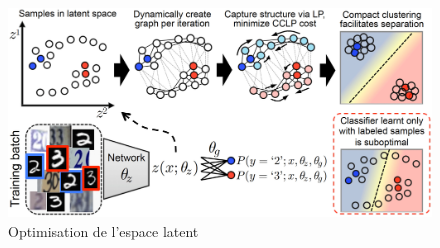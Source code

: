 \documentclass[../thesis.tex]{subfiles}
\begin{document}
    \begin{figure}[H]
        \centering
        \includegraphics[width=0.7\linewidth]{img/biblio/classification-latent-space}
        \caption{Optimisation de l'espace latent}
        \label{fig:03-classification-latent-space}
    \end{figure}
    
    
\end{document}
